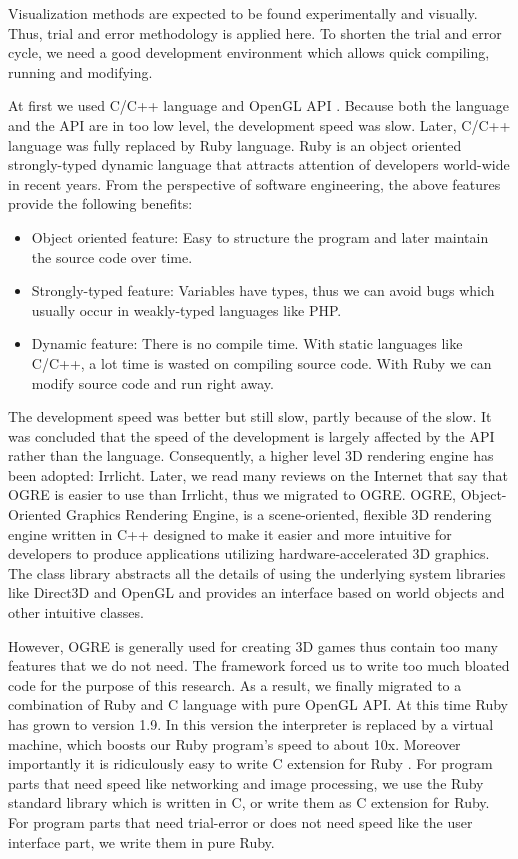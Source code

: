 Visualization methods are expected to be found experimentally and visually. Thus, trial and error methodology is applied here. To shorten the trial and error cycle, we need a good development environment which allows quick compiling, running and modifying.

At first we used C/C++ language and OpenGL API \citep{Reference10}. Because both the language and the API are in too low level, the development speed was slow. Later, C/C++ language was fully replaced by Ruby language. Ruby is an object oriented strongly-typed dynamic language that attracts attention of developers world-wide in recent years. From the perspective of software engineering, the above features provide the following benefits:

\begin{itemize}
	\item Object oriented feature: Easy to structure the program and later maintain the source code over time.
	\item Strongly-typed feature: Variables have types, thus we can avoid bugs which usually occur in weakly-typed languages like PHP.
	\item Dynamic feature: There is no compile time. With static languages like C/C++, a lot time is wasted on compiling source code. With Ruby we can modify source code and run right away.
\end{itemize}

The development speed was better but still slow, partly because of the slow. It was concluded that the speed of the development is largely affected by the API rather than the language. Consequently, a higher level 3D rendering engine has been adopted: Irrlicht. Later, we read many reviews on the Internet that say that OGRE \citep{Reference11} is easier to use than Irrlicht, thus we migrated to OGRE. OGRE, Object-Oriented Graphics Rendering Engine, is a scene-oriented, flexible 3D rendering engine written in C++ designed to make it easier and more intuitive for developers to produce applications utilizing hardware-accelerated 3D graphics. The class library abstracts all the details of using the underlying system libraries like Direct3D and OpenGL and provides an interface based on world objects and other intuitive classes.

However, OGRE is generally used for creating 3D games thus contain too many features that we do not need. The framework forced us to write too much bloated code for the purpose of this research. As a result, we finally migrated to a combination of Ruby and C language with pure OpenGL API. At this time Ruby has grown to version 1.9. In this version the interpreter is replaced by a virtual machine, which boosts our Ruby program's speed to about 10x. Moreover importantly it is ridiculously easy to write C extension for Ruby \citep{Reference15}. For program parts that need speed like networking and image processing, we use the Ruby standard library which is written in C, or write them as C extension for Ruby. For program parts that need trial-error or does not need speed like the user interface part, we write them in pure Ruby.


